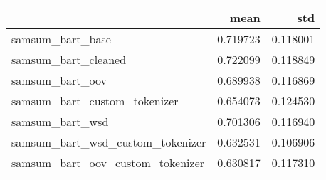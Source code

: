 \begin{tabular}{lrr}
\toprule
 & mean & std \\
\midrule
samsum_bart_base & 0.719723 & 0.118001 \\
samsum_bart_cleaned & 0.722099 & 0.118849 \\
samsum_bart_oov & 0.689938 & 0.116869 \\
samsum_bart_custom_tokenizer & 0.654073 & 0.124530 \\
samsum_bart_wsd & 0.701306 & 0.116940 \\
samsum_bart_wsd_custom_tokenizer & 0.632531 & 0.106906 \\
samsum_bart_oov_custom_tokenizer & 0.630817 & 0.117310 \\
\bottomrule
\end{tabular}
